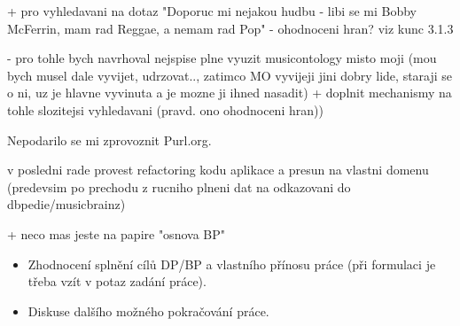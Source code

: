 + pro vyhledavani na dotaz "Doporuc mi nejakou hudbu - libi se mi Bobby McFerrin, mam rad Reggae, a nemam rad Pop" - ohodnoceni hran? viz kunc 3.1.3

      - pro tohle bych navrhoval nejspise plne vyuzit musicontology misto moji (mou bych musel dale vyvijet, udrzovat.., zatimco MO vyvijeji jini dobry lide, staraji se o ni, uz je hlavne vyvinuta a je mozne ji ihned nasadit) + doplnit mechanismy na tohle slozitejsi vyhledavani (pravd. ono ohodnoceni hran))
      
      Nepodarilo se mi zprovoznit Purl.org.
      
      
      v posledni rade provest refactoring kodu aplikace a presun na vlastni domenu (predevsim po prechodu z rucniho plneni dat na odkazovani do dbpedie/musicbrainz)
      
      
      
      + neco mas jeste na papire "osnova BP"
      
\begin{itemize}
\item Zhodnocení splnění cílů DP/BP a  vlastního přínosu práce (při formulaci je třeba vzít v potaz zadání práce).
\item Diskuse dalšího možného pokračování práce.
\end{itemize} 